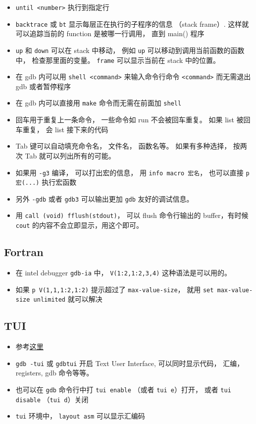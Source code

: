 \begin{itemize}
\item \verb`until <number>` 执行到指定行
\item \verb`backtrace` 或 \verb`bt` 显示每层正在执行的子程序的信息 （stack frame）. 这样就可以追踪当前的 function 是被哪一行调用， 直到 main() 程序
\item \verb|up| 和 \verb|down| 可以在 stack 中移动， 例如 \verb|up| 可以移动到调用当前函数的函数中， 检查那里面的变量。 \verb`frame` 可以显示当前在 stack 中的位置。
\item 在 gdb 内可以用 \verb`shell <command>` 来输入命令行命令 \verb`<command>` 而无需退出 gdb 或者暂停程序
\item 在 gdb 内可以直接用 \verb`make` 命令而无需在前面加 \verb`shell`
\item 回车用于重复上一条命令， 一些命令如 run 不会被回车重复。 如果 list 被回车重复， 会 list 接下来的代码
\item Tab 键可以自动填充命令名， 文件名， 函数名等。 如果有多种选择， 按两次 Tab 就可以列出所有的可能。
\item 如果用 \verb|-g3| 编译， 可以打出宏的信息， 用 \verb|info macro 宏名|， 也可以直接 \verb|p 宏(...)| 执行宏函数
\item 另外 \verb|-gdb| 或者 \verb|gdb3| 可以输出更加 \verb|gdb| 友好的调试信息。
\item 用 \verb|call (void) fflush(stdout)|， 可以 flush 命令行输出的 buffer，有时候 \verb|cout| 的内容不会立即显示，用这个即可。
\end{itemize}

\subsection{Fortran}
\begin{itemize}
\item 在 intel debugger \verb`gdb-ia` 中， \verb`V(1:2,1:2,3,4)` 这种语法是可以用的。
\item 如果 \verb`p V(1,1,1:2,1:2)` 提示超过了 \verb`max-value-size`， 就用 \verb`set max-value-size unlimited` 就可以解决
\end{itemize}

\subsection{TUI}
\begin{itemize}
\item 参考\href{https://developer.apple.com/library/archive/documentation/DeveloperTools/gdb/gdb/gdb_toc.html#TOC229}{这里}
\item \verb`gdb -tui` 或 \verb`gdbtui` 开启 Text User Interface, 可以同时显示代码， 汇编， registers, gdb 命令等等。
\item 也可以在 \verb|gdb| 命令行中打 \verb|tui enable| （或者 \verb|tui e|）打开， 或者 \verb|tui disable| （\verb|tui d|）关闭
\item \verb|tui| 环境中， \verb|layout asm| 可以显示汇编码
\end{itemize}


